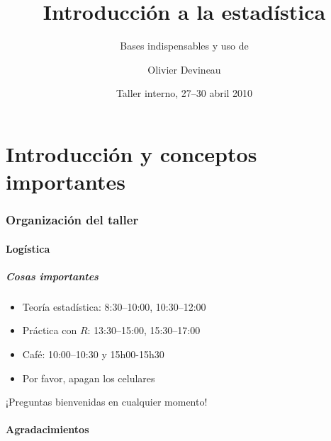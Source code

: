 \documentclass[mathserif]{beamer}
\title[Introducci\'on a la estad\'istica]{Introducci\'on a la estad\'istica}
\subtitle[Bases indispensables y uso de R]{Bases indispensables y uso de \Rlogo}
\author[]{Olivier Devineau}
\institute[]{Fundaci\'on Charles Darwin}
\date[]{Taller interno, 27--30 abril 2010}
\begin{document}
\begin{frame}[label=title]
  \titlepage
\end{frame}%





\part[Introducci\'on]{Introducci\'on y conceptos importantes}



  
\section*{Organizaci\'on del taller}

\subsection*{Log\'istica}

\begin{frame}[label=admin]
  \frametitle{Cosas importantes}
  \begin{itemize}
    \item Teor\'ia estad\'istica: {\small 8:30--10:00, 10:30--12:00}
    \item Pr\'actica con $R$: {\small 13:30--15:00, 15:30--17:00}
    \item Caf\'e: {\small 10:00--10:30 y 15h00-15h30}
    \item Por favor, apagan los celulares
  \end{itemize}
  \begin{block}{}
    \begin{center}
      ¡Preguntas bienvenidas en cualquier momento!
    \end{center}
  \end{block}
\end{frame}%


\subsection*{Agradacimientos}
\end{document}
